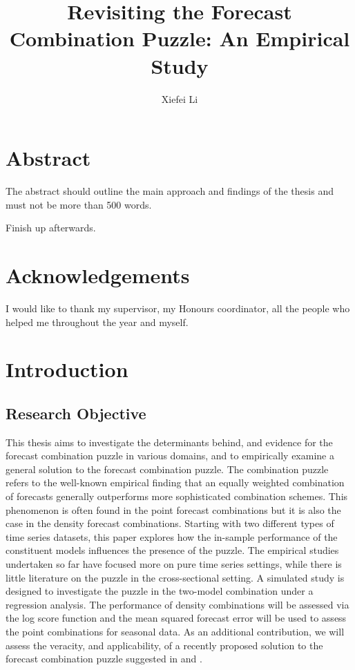 \documentclass{monashthesis}
\author{Xiefei Li}
\title{Revisiting the Forecast Combination Puzzle: An Empirical Study}
\begin{document}

\titlepage

{\sf\tighttoc\doublespacing}

\clearpage{}\setcounter{page}{1}

\hypertarget{abstract}{%
\chapter*{Abstract}\label{abstract}}

The abstract should outline the main approach and findings of the thesis and must not be more than 500 words.

Finish up afterwards.

\newpage

\hypertarget{acknowledgements}{%
\chapter*{Acknowledgements}\label{acknowledgements}}

I would like to thank my supervisor, my Honours coordinator, all the people who helped me throughout the year and myself.

\hypertarget{introduction}{%
\chapter{Introduction}\label{introduction}}

\hypertarget{research-objective}{%
\section{Research Objective}\label{research-objective}}

This thesis aims to investigate the determinants behind, and evidence for the forecast combination puzzle in various domains, and to empirically examine a general solution to the forecast combination puzzle. The combination puzzle refers to the well-known empirical finding that an equally weighted combination of forecasts generally outperforms more sophisticated combination schemes. This phenomenon is often found in the point forecast combinations but it is also the case in the density forecast combinations. Starting with two different types of time series datasets, this paper explores how the in-sample performance of the constituent models influences the presence of the puzzle. The empirical studies undertaken so far have focused more on pure time series settings, while there is little literature on the puzzle in the cross-sectional setting. A simulated study is designed to investigate the puzzle in the two-model combination under a regression analysis. The performance of density combinations will be assessed via the log score function and the mean squared forecast error will be used to assess the point combinations for seasonal data. As an additional contribution, we will assess the veracity, and applicability, of a recently proposed solution to the forecast combination puzzle suggested in \textcite{ZMFP22} and \textcite{FZMP23}.
\end{document}
